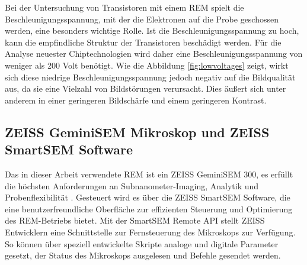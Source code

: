 \newpage
Bei der Untersuchung von Transistoren mit einem REM spielt die Beschleunigungsspannung, mit der die Elektronen auf die Probe geschossen werden, eine besonders wichtige Rolle. Ist die Beschleunigungsspannung zu hoch, kann die empfindliche Struktur der Transistoren beschädigt werden. Für die Analyse neuester Chiptechnologien wird daher eine Beschleunigungsspannung von weniger als 200 Volt benötigt. Wie die Abbildung \ref{fig:lowvoltages} zeigt, wirkt sich diese niedrige Beschleunigungsspannung jedoch negativ auf die Bildqualität aus, da sie eine Vielzahl von Bildstörungen verursacht. Dies äußert sich unter anderem in einer geringeren Bildschärfe und einem geringeren Kontrast.
\subsection*{ZEISS GeminiSEM Mikroskop und ZEISS SmartSEM Software}
Das in dieser Arbeit verwendete REM ist ein ZEISS GeminiSEM 300, es erfüllt die höchsten Anforderungen an Subnanometer-Imaging, Analytik und Probenflexibilität \cite{geminisem}.
Gesteuert wird es über die \glqq ZEISS SmartSEM Software\grqq{}, die eine benutzerfreundliche Oberfläche zur effizienten Steuerung und Optimierung des REM-Betriebs bietet.
Mit der \glqq SmartSEM Remote API\grqq{} stellt ZEISS Entwicklern eine Schnittstelle zur Fernsteuerung des Mikroskops zur Verfügung.
So können über speziell entwickelte Skripte analoge und digitale Parameter gesetzt, der Status des Mikroskops ausgelesen und Befehle gesendet werden.
\newpage
